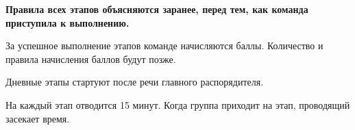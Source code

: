 
\par \textbf{Правила всех этапов объясняются заранее, перед тем, как команда приступила к выполнению.}
\par За успешное выполнение этапов команде начисляются баллы. Количество и правила начисления баллов будут позже.
\par Дневные этапы стартуют после речи главного распорядителя.
\par На каждый этап отводится 15 минут. Когда группа приходит на этап, проводящий засекает время.










